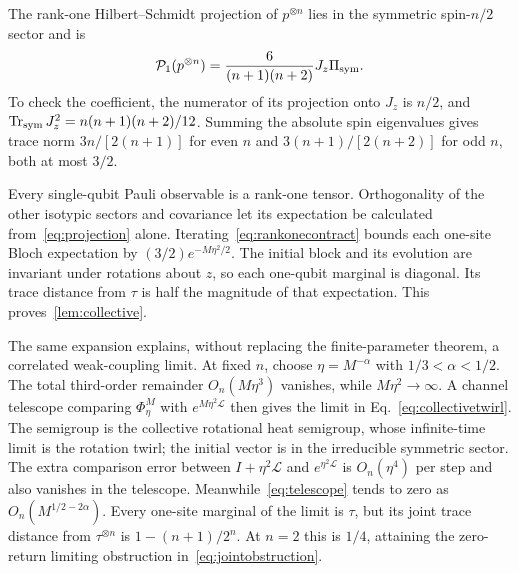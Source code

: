The rank-one Hilbert--Schmidt projection of $p^{\otimes n}$ lies in the symmetric spin-$n/2$ sector and is
\begin{equation}
 \mathcal P_1(p^{\otimes n})=\frac6{(n+1)(n+2)}J_z\Pi_{\rm sym}.
 \label{eq:projection}
\end{equation}
To check the coefficient, the numerator of its projection onto $J_z$ is $n/2$, and $\operatorname{Tr}_{\rm sym}J_z^2=n(n+1)(n+2)/12$. Summing the absolute spin eigenvalues gives trace norm $3n/[2(n+1)]$ for even $n$ and $3(n+1)/[2(n+2)]$ for odd $n$, both at most $3/2$.

Every single-qubit Pauli observable is a rank-one tensor. Orthogonality of the other isotypic sectors and covariance let its expectation be calculated from~\eqref{eq:projection} alone. Iterating~\eqref{eq:rankonecontract} bounds each one-site Bloch expectation by $(3/2)e^{-M\eta^2/2}$. The initial block and its evolution are invariant under rotations about $z$, so each one-qubit marginal is diagonal. Its trace distance from $\tau$ is half the magnitude of that expectation. This proves~\cref{lem:collective}.

The same expansion explains, without replacing the finite-parameter theorem, a correlated weak-coupling limit. At fixed $n$, choose $\eta=M^{-\alpha}$ with $1/3<\alpha<1/2$. The total third-order remainder $O_n(M\eta^3)$ vanishes, while $M\eta^2\to\infty$. A channel telescope comparing $\Phi_\eta^M$ with $e^{M\eta^2\mathcal L}$ then gives
the limit in Eq.~\eqref{eq:collectivetwirl}.
The semigroup is the collective rotational heat semigroup, whose infinite-time limit is the rotation twirl; the initial vector is in the irreducible symmetric sector. The extra comparison error between $I+\eta^2\mathcal L$ and $e^{\eta^2\mathcal L}$ is $O_n(\eta^4)$ per step and also vanishes in the telescope. Meanwhile~\eqref{eq:telescope} tends to zero as $O_n(M^{1/2-2\alpha})$. Every one-site marginal of the limit is $\tau$, but its joint trace distance from $\tau^{\otimes n}$ is $1-(n+1)/2^n$. At $n=2$ this is $1/4$, attaining the zero-return limiting obstruction in~\eqref{eq:jointobstruction}. 

